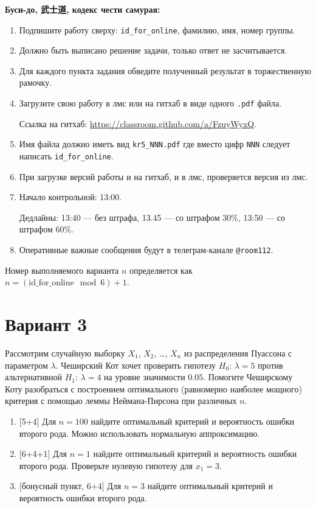 \documentclass[12pt]{article}
\newcommand \id {\mathrm{id}\_\mathrm{for}\_\mathrm{online}}
\begin{document}
\vspace{15mm}


\textbf{Буси-до, 武士道, кодекс чести самурая:}

\vspace{5mm}

\begin{enumerate}
\item Подпишите работу сверху: \verb|id_for_online|, фамилию, имя, номер группы.
\item Должно быть выписано решение задачи, только ответ не засчитывается.
\item Для каждого пункта задания обведите полученный результат в торжественную рамочку.
\item Загрузите свою работу в лмс или на гитхаб в виде одного \verb|.pdf| файла.

Ссылка на гитхаб: \url{https://classroom.github.com/a/FzuyWyxQ}.
\item Имя файла должно иметь вид \verb|kr5_NNN.pdf| где вместо цифр \verb|NNN| следует написать \verb|id_for_online|.
\item При загрузке версий работы и на гитхаб, и в лмс, проверяется версия из лмс. 
\item Начало контрольной: 13:00. 

Дедлайны: 13:40 — без штрафа, 13.45 — со штрафом 30\%, 13:50 — со штрафом 60\%.
\item Оперативные важные сообщения будут в телеграм-канале \verb|@room112|.
\end{enumerate}


\newpage

Номер выполняемого варианта $n$ определяется как $n=(\id \mod 6)+1$. 

\section*{Вариант 3}


Рассмотрим случайную выборку $X_1$, $X_2$, \ldots, $X_n$ из распределения Пуассона с параметром $\lambda$. 
Чеширский Кот хочет проверить гипотезу $H_0$: $\lambda = 5$ против альтернативной $H_1$: $\lambda = 4$ на уровне
значимости $0.05$. Помогите Чеширскому Коту разобраться с построением оптимального (равномерно наиболее мощного)
критерия с помощью леммы Неймана-Пирсона при различных $n$.

\begin{enumerate}
  \item {[5+4]} Для $n=100$ найдите оптимальный критерий и вероятность ошибки второго рода. Можно использовать нормальную аппроксимацию.
  \item {[6+4+1]} Для $n=1$ найдите оптимальный критерий и вероятность ошибки второго рода. Проверьте нулевую гипотезу для $x_1 = 3$. 
  \item {[бонусный пункт, 6+4]} Для $n=3$ найдите оптимальный критерий и вероятность ошибки второго рода.
\end{enumerate}
\end{document}
